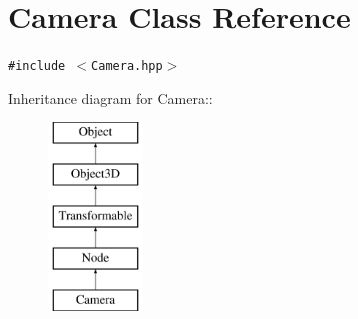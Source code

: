 \hypertarget{classm3g_1_1Camera}{
\section{Camera Class Reference}
\label{classm3g_1_1Camera}
}
{\tt \#include $<$Camera.hpp$>$}

Inheritance diagram for Camera::\begin{figure}[H]
\begin{center}
\leavevmode
\includegraphics[height=5cm]{classm3g_1_1Camera}
\end{center}
\end{figure}
